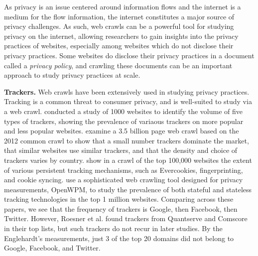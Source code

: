 As privacy is an issue centered around information flows and the internet is a medium for the flow information, the internet constitutes a major source of privacy challenges. As such, web crawls can be a powerful tool for studying privacy on the internet, allowing researchers to gain insights into the privacy practices of websites, especially among websites which do not disclose their privacy practices. Some websites do disclose their privacy practices in a document called a \textit{privacy policy}, and crawling these documents can be an important approach to study privacy practices at scale. 

\textbf{Trackers.}
Web crawls have been extensively used in studying privacy practices. Tracking is a common threat to consumer privacy, and is well-suited to study via a web crawl. \citet{roesner2012detecting} conducted a study of 1000 websites to identify the volume of five types of trackers, showing the prevalence of variaous trackers on more popular and less popular websites. \citet{schelter2018ubiquity} examine a 3.5 billion page web crawl based on the 2012 common crawl to show that a small number trackers dominate the market, that similar websites use similar trackers, and that the density and choice of trackers varies by country. \citet{acar2014web} show in a crawl of the top 100,000 websites the extent of various persistent tracking mechanisms, such as Evercookies, fingerprinting, and cookie syncing. \citet{englehardt2016online} use a sophisticated web crawling tool designed for privacy measurements, OpenWPM, to study the prevalence of both stateful and stateless tracking technologies in the top 1 million websites. Comparing across these papers, we see that the frequency of trackers is Google, then Facebook, then Twitter. However, Roesner et al. found trackers from Quantserve and Comscore in their top lists, but such trackers do not recur in later studies. By the Englehardt's measurements, just 3 of the top 20 domains did not belong to Google, Facebook, and Twitter. 

